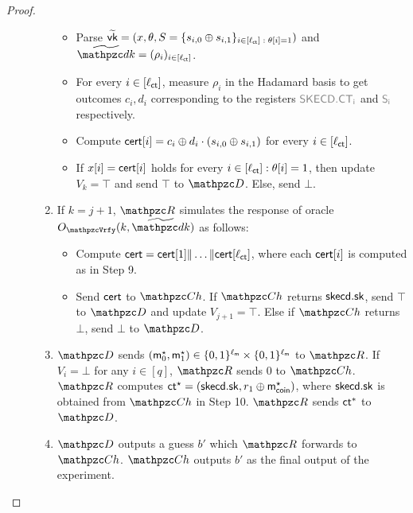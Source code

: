\begin{proof}
\begin{description}
\begin{enumerate}
\begin{itemize}
\item Parse $\widetilde{\mathsf{vk}} =
(x,\theta,S=\{s_{i,0} \oplus
s_{i,1}\}_{i\in[\ell_{\mathsf{ct}}]\;:\;\theta[i]=1})$ and $\widetilde{\qdk} =
(\rho_i)_{i\in[\ctlen]}$.

\item For every $i \in [\ell_{\mathsf{ct}}]$, measure $\rho_i$ in the Hadamard
basis to get outcomes $c_i, d_i$ corresponding to the registers
$\qreg{SKECD.CT_i}$ and $\qreg{S_i}$ respectively.

\item Compute $\mathsf{cert}[i] = c_i \oplus d_i \cdot (s_{i,0} \oplus
s_{i,1})$ for every $i \in [\ell_{\mathsf{ct}}]$.

\item If $x[i] = \mathsf{cert}[i]$ holds
for every $i \in [\ell_{\mathsf{ct}}] : \theta[i] = 1$, then update $V_k = \top$
and send $\top$ to $\qD$. Else, send $\bot$.
\end{itemize}

\item If $k = j+1$, $\qR$ simulates
the response  of oracle $\Oracle{\qVrfy}(k, \widetilde{\qdk})$ as
follows:

\begin{itemize}
\item Compute $\mathsf{cert} = \mathsf{cert}[1] \| \ldots \| \mathsf{cert}[\ell_{\mathsf{ct}}]$,
where each $\mathsf{cert}[i]$ is computed as in Step 9.

\item Send $\mathsf{cert}$ to $\qCh$. If $\qCh$ returns $\mathsf{skecd}.\mathsf{sk}$, send $\top$ to $\qD$ and update $V_{j+1}= \top$. Else if $\qCh$ returns $\bot$, send $\bot$ to $\qD$.
\end{itemize}

\item $\qD$ sends $(\mathsf{m}_0^\star, \mathsf{m}_1^\star) \in \{0,1\}^{\ell_{\mathsf{m}}} \times
\{0,1\}^{\ell_{\mathsf{m}}}$ to $\qR$. If $V_i = \bot$ for any $i \in [q]$, $\qR$
sends $0$ to $\qCh$.
$\qR$ computes $\mathsf{ct}^\star = (\mathsf{skecd}.\mathsf{sk}, r_1 \oplus \mathsf{m}^\star_{\mathsf{coin}})$,
where $\mathsf{skecd}.\mathsf{sk}$ is obtained from $\qCh$ in Step 10. $\qR$ sends $\mathsf{ct}^*$ to $\qD$.

\item $\qD$ outputs a guess $b'$ which $\qR$ forwards to $\qCh$.
$\qCh$ outputs $b'$ as the final output of the experiment.
\end{enumerate}
\end{description}


\end{proof}
